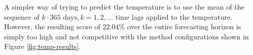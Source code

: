 \documentclass[conference]{IEEEtran}
\begin{document}
A simpler way of trying to predict the temperature is to use the mean of the sequence of $k\cdot 365 \text{ days}, k=1,2,\dots$ time lags applied to the temperature. However, the resulting score of 22.04\% over the entire forecasting horizon is simply too high and not competitive with the method configurations shown in Figure \ref{fig:temp-results}. 

\end{document}
